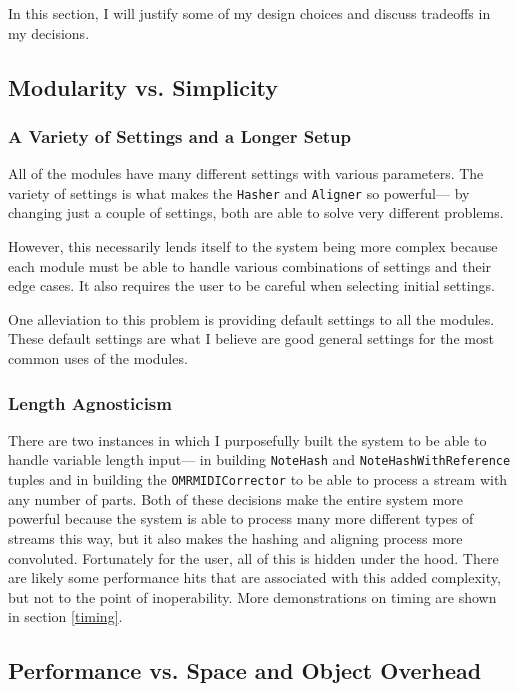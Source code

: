 In this section, I will justify some of my design choices and discuss tradeoffs in my decisions. 

\subsection{Modularity vs. Simplicity}
\subsubsection{A Variety of Settings and a Longer Setup}
All of the modules have many different settings with various parameters. The variety of settings is what makes the \texttt{Hasher} and \texttt{Aligner} so powerful--- by changing just a couple of settings, both are able to solve very different problems.

However, this necessarily lends itself to the system being more complex because each module must be able to handle various combinations of settings and their edge cases. It also requires the user to be careful when selecting initial settings. 

One alleviation to this problem is providing default settings to all the modules. These default settings are what I believe are good general settings for the most common uses of the modules. 

\subsubsection{Length Agnosticism}
There are two instances in which I purposefully built the system to be able to handle variable length input--- in building \texttt{NoteHash} and \texttt{NoteHashWithReference} tuples and in building the \texttt{OMRMIDICorrector} to be able to process a stream with any number of parts. Both of these decisions make the entire system more powerful because the system is able to process many more different types of streams this way, but it also makes the hashing and aligning process more convoluted. Fortunately for the user, all of this is hidden under the hood. There are likely some performance hits that are associated with this added complexity, but not to the point of inoperability. More demonstrations on timing are shown in section \ref{timing}.

\subsection{Performance vs. Space and Object Overhead}

